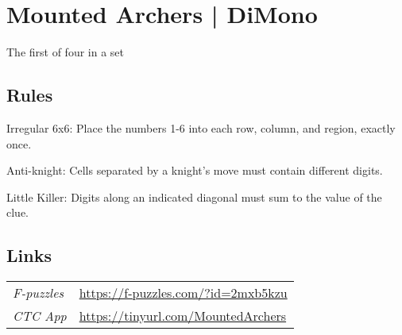 \section[Mounted Archers | DiMono {[\emph{6\emph{x}6 Irregular Anti-Knight Little Killer}]}]{Mounted Archers | {\normalfont DiMono}}
\label{sec:20-mounted-archers-dimono}
The first of four in a set
\subsection*{Rules}
\begin{markdown}
Irregular 6x6: Place the numbers 1-6 into each row, column, and region, exactly once.



Anti-knight: Cells separated by a knight's move must contain different digits.



Little Killer: Digits along an indicated diagonal must sum to the value of the clue.
\end{markdown}
\subsection*{Links}
\begin{tabularx}{\textwidth}{l X}
\emph{F-puzzles} & \url{https://f-puzzles.com/?id=2mxb5kzu} \\
\emph{CTC App} & \url{https://tinyurl.com/MountedArchers} \\
\end{tabularx}
\pagebreak
